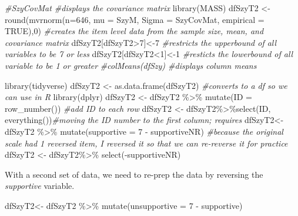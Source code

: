 \documentclass[
  english,
]{book}
\newenvironment{Shaded}{\begin{snugshade}}{\end{snugshade}}
\newcommand{\AttributeTok}[1]{\textcolor[rgb]{0.77,0.63,0.00}{#1}}
\newcommand{\CommentTok}[1]{\textcolor[rgb]{0.56,0.35,0.01}{\textit{#1}}}
\newcommand{\ConstantTok}[1]{\textcolor[rgb]{0.00,0.00,0.00}{#1}}
\newcommand{\DecValTok}[1]{\textcolor[rgb]{0.00,0.00,0.81}{#1}}
\newcommand{\FunctionTok}[1]{\textcolor[rgb]{0.00,0.00,0.00}{#1}}
\newcommand{\NormalTok}[1]{#1}
\newcommand{\OtherTok}[1]{\textcolor[rgb]{0.56,0.35,0.01}{#1}}
\newcommand{\SpecialCharTok}[1]{\textcolor[rgb]{0.00,0.00,0.00}{#1}}
\begin{document}
\begin{Shaded}
\begin{Highlighting}[]
\CommentTok{\#SzyCovMat \#displays the covariance matrix}
\FunctionTok{library}\NormalTok{(MASS)}
\NormalTok{dfSzyT2 }\OtherTok{\textless{}{-}} \FunctionTok{round}\NormalTok{(}\FunctionTok{mvrnorm}\NormalTok{(}\AttributeTok{n=}\DecValTok{646}\NormalTok{, }\AttributeTok{mu =}\NormalTok{ SzyM, }\AttributeTok{Sigma =}\NormalTok{ SzyCovMat, }\AttributeTok{empirical =} \ConstantTok{TRUE}\NormalTok{),}\DecValTok{0}\NormalTok{) }\CommentTok{\#creates the item level data from the sample size, mean, and covariance matrix}
\NormalTok{dfSzyT2[dfSzyT2}\SpecialCharTok{\textgreater{}}\DecValTok{7}\NormalTok{]}\OtherTok{\textless{}{-}}\DecValTok{7} \CommentTok{\#restricts the upperbound of all variables to be 7 or less}
\NormalTok{dfSzyT2[dfSzyT2}\SpecialCharTok{\textless{}}\DecValTok{1}\NormalTok{]}\OtherTok{\textless{}{-}}\DecValTok{1} \CommentTok{\#resticts the lowerbound of all variable to be 1 or greater}
\CommentTok{\#colMeans(dfSzy) \#displays column means}

\FunctionTok{library}\NormalTok{(tidyverse)}
\NormalTok{dfSzyT2 }\OtherTok{\textless{}{-}} \FunctionTok{as.data.frame}\NormalTok{(dfSzyT2) }\CommentTok{\#converts to a df so we can use in R}
\FunctionTok{library}\NormalTok{(dplyr)}
\NormalTok{dfSzyT2 }\OtherTok{\textless{}{-}}\NormalTok{ dfSzyT2 }\SpecialCharTok{\%\textgreater{}\%} \FunctionTok{mutate}\NormalTok{(}\AttributeTok{ID =} \FunctionTok{row\_number}\NormalTok{()) }\CommentTok{\#add ID to each row}
\NormalTok{dfSzyT2 }\OtherTok{\textless{}{-}}\NormalTok{ dfSzyT2}\SpecialCharTok{\%\textgreater{}\%}\FunctionTok{select}\NormalTok{(ID, }\FunctionTok{everything}\NormalTok{())}\CommentTok{\#moving the ID number to the first column; requires}
\NormalTok{dfSzyT2}\OtherTok{\textless{}{-}}\NormalTok{ dfSzyT2 }\SpecialCharTok{\%\textgreater{}\%}
  \FunctionTok{mutate}\NormalTok{(}\AttributeTok{supportive =} \DecValTok{7} \SpecialCharTok{{-}}\NormalTok{ supportiveNR) }\CommentTok{\#because the original scale had 1 reversed item, I reversed it so that we can re{-}reverse it for practice}
\NormalTok{dfSzyT2 }\OtherTok{\textless{}{-}}\NormalTok{ dfSzyT2}\SpecialCharTok{\%\textgreater{}\%}
  \FunctionTok{select}\NormalTok{(}\SpecialCharTok{{-}}\NormalTok{supportiveNR)}
\end{Highlighting}
\end{Shaded}

With a second set of data, we need to re-prep the data by reversing the \emph{supportive} variable.

\begin{Shaded}
\begin{Highlighting}[]
\NormalTok{dfSzyT2}\OtherTok{\textless{}{-}}\NormalTok{ dfSzyT2 }\SpecialCharTok{\%\textgreater{}\%}
  \FunctionTok{mutate}\NormalTok{(}\AttributeTok{unsupportive =} \DecValTok{7} \SpecialCharTok{{-}}\NormalTok{ supportive)}
\end{Highlighting}
\end{Shaded}
\end{document}

